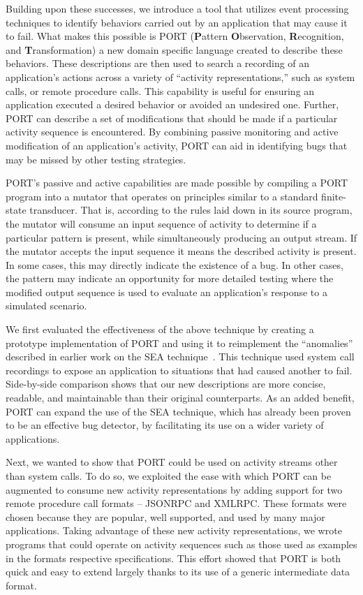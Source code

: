 Building upon these successes,
we introduce a tool
that utilizes event processing techniques
to identify
behaviors carried out by an application
that may cause it to fail.
What makes this possible is PORT
(\textbf{P}attern \textbf{O}bservation, \textbf{R}ecognition, and
\textbf{T}ransformation)
a new domain specific language
created to describe these behaviors.
These descriptions are then used
to search a recording of an application's actions
across a variety of ``activity representations,''
such as system calls,
or remote procedure calls.
This capability is useful
for ensuring an application executed a desired behavior
or avoided an undesired one.
Further, PORT can describe
a set of modifications
that should be made
if a particular activity sequence is encountered.
By combining passive monitoring and active modification
of an application's activity,
PORT can aid in identifying bugs
that may be missed by other testing strategies.

PORT's passive and active capabilities are made possible
by compiling a PORT program
into a mutator
that operates on principles similar
to a standard finite-state transducer.
That is,
according to the rules laid down in its source program,
the mutator will consume an input sequence of activity
to determine if a particular pattern is present,
while simultaneously producing an output stream.
If the mutator accepts the input sequence
it means the described activity is present.
In some cases,
this may directly indicate
the existence of a bug.
In other cases,
the pattern may
indicate an opportunity
for more detailed testing
where the modified output sequence is used
to evaluate an application's response to a simulated scenario.

We first evaluated the effectiveness of the above technique
by creating a prototype implementation of PORT
and using it to
reimplement the ``anomalies''
described in earlier work on the SEA technique~\cite{DBLP:conf/issre/MooreCFW19}.
This technique used system call recordings
to expose an application to situations that had caused another to fail.
Side-by-side comparison shows that our new
descriptions are more concise,
readable,
and maintainable
than their original counterparts.
As an added benefit,
PORT can expand the use of the SEA technique,
which has already been proven
to be an effective bug detector,
by facilitating its use
on a wider variety of applications.

Next, we wanted to
show that PORT
could be used on activity streams
other than system calls.
To do so,
we exploited the ease with which
PORT can be augmented
to consume new activity representations
by adding support for two remote procedure call formats -- JSONRPC and XMLRPC.
These formats were chosen
because they are popular,
well supported, and
used by many major applications.
Taking advantage of these new activity representations,
we wrote programs that could operate on activity sequences such as those
used as examples in the formats respective specifications.  This effort
showed that PORT is both quick and easy to extend largely thanks to its
use of a generic intermediate data format.

